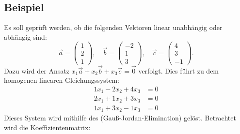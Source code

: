 \subsection*{Beispiel}
Es soll geprüft werden, ob die folgenden Vektoren linear unabhängig oder
abhängig sind:
\[
    \vec{a} = \begin{pmatrix} 1 \\ 2 \\ 1 \end{pmatrix}, \quad \vec{b} = \begin{pmatrix} -2 \\ 1 \\ 3 \end{pmatrix}, \quad \vec{c} = \begin{pmatrix} 4 \\ 3 \\ -1 \end{pmatrix}.
\]
Dazu wird der Ansatz $x_1 \vec{a} + x_2 \vec{b} + x_3 \vec{c} = \vec{0}$
verfolgt. Dies führt zu dem homogenen linearen Gleichungssystem:
\begin{align*}
    1x_1 - 2x_2 + 4x_3 & = 0 \\
    2x_1 + 1x_2 + 3x_3 & = 0 \\
    1x_1 + 3x_2 - 1x_3 & = 0
\end{align*}
Dieses System wird mithilfe des  (Gauß-Jordan-Elimination) gelöst. Betrachtet wird die Koeffizientenmatrix:

